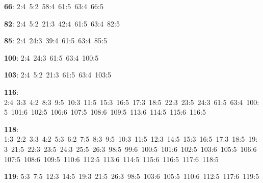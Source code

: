 \noindent \textbf{66}: 2:4\allowbreak\ 5:2\allowbreak\ 58:4\allowbreak\ 61:5\allowbreak\ 63:4\allowbreak\ 66:5\par
\noindent \textbf{82}: 2:4\allowbreak\ 5:2\allowbreak\ 21:3\allowbreak\ 42:4\allowbreak\ 61:5\allowbreak\ 63:4\allowbreak\ 82:5\par
\noindent \textbf{85}: 2:4\allowbreak\ 24:3\allowbreak\ 39:4\allowbreak\ 61:5\allowbreak\ 63:4\allowbreak\ 85:5\par
\noindent \textbf{100}: 2:4\allowbreak\ 24:3\allowbreak\ 61:5\allowbreak\ 63:4\allowbreak\ 100:5\par
\noindent \textbf{103}: 2:4\allowbreak\ 5:2\allowbreak\ 21:3\allowbreak\ 61:5\allowbreak\ 63:4\allowbreak\ 103:5\par
\noindent \textbf{116}: 2:4\allowbreak\ 3:3\allowbreak\ 4:2\allowbreak\ 8:3\allowbreak\ 9:5\allowbreak\ 10:3\allowbreak\ 11:5\allowbreak\ 15:3\allowbreak\ 16:5\allowbreak\ 17:3\allowbreak\ 18:5\allowbreak\ 22:3\allowbreak\ 23:5\allowbreak\ 24:3\allowbreak\ 61:5\allowbreak\ 63:4\allowbreak\ 100:5\allowbreak\ 101:6\allowbreak\ 102:5\allowbreak\ 106:6\allowbreak\ 107:5\allowbreak\ 108:6\allowbreak\ 109:5\allowbreak\ 113:6\allowbreak\ 114:5\allowbreak\ 115:6\allowbreak\ 116:5\par
\noindent \textbf{118}: 1:3\allowbreak\ 2:2\allowbreak\ 3:3\allowbreak\ 4:2\allowbreak\ 5:3\allowbreak\ 6:2\allowbreak\ 7:5\allowbreak\ 8:3\allowbreak\ 9:5\allowbreak\ 10:3\allowbreak\ 11:5\allowbreak\ 12:3\allowbreak\ 14:5\allowbreak\ 15:3\allowbreak\ 16:5\allowbreak\ 17:3\allowbreak\ 18:5\allowbreak\ 19:3\allowbreak\ 21:5\allowbreak\ 22:3\allowbreak\ 23:5\allowbreak\ 24:3\allowbreak\ 25:5\allowbreak\ 26:3\allowbreak\ 98:5\allowbreak\ 99:6\allowbreak\ 100:5\allowbreak\ 101:6\allowbreak\ 102:5\allowbreak\ 103:6\allowbreak\ 105:5\allowbreak\ 106:6\allowbreak\ 107:5\allowbreak\ 108:6\allowbreak\ 109:5\allowbreak\ 110:6\allowbreak\ 112:5\allowbreak\ 113:6\allowbreak\ 114:5\allowbreak\ 115:6\allowbreak\ 116:5\allowbreak\ 117:6\allowbreak\ 118:5\par
\noindent \textbf{119}: 5:3\allowbreak\ 7:5\allowbreak\ 12:3\allowbreak\ 14:5\allowbreak\ 19:3\allowbreak\ 21:5\allowbreak\ 26:3\allowbreak\ 98:5\allowbreak\ 103:6\allowbreak\ 105:5\allowbreak\ 110:6\allowbreak\ 112:5\allowbreak\ 117:6\allowbreak\ 119:5\par
